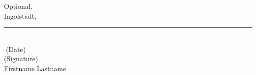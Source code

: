 


Optional.\\ 
	
Ingolstadt, \rule{0.3\textwidth}{0.4pt}	\\
\textcolor{white}{.}\qquad\qquad\qquad\qquad\quad \small (Date) \\ [1.3cm]
	
(Signature) \\
Firstname Lastname